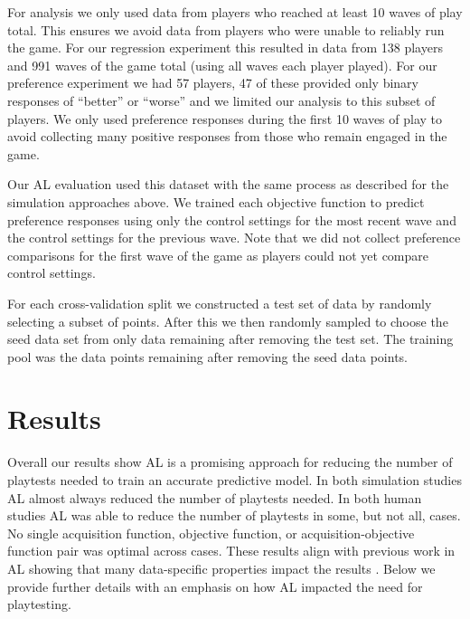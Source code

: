 \documentclass{sig-alternate}
\begin{document}
For analysis we only used data from players who reached at least 10 waves of play total.
This ensures we avoid data from players who were unable to reliably run the game.
For our regression experiment this resulted in data from 138 players and 991 waves of the game total (using all waves each player played).
For our preference experiment we had 57 players, 47 of these provided only binary responses of ``better'' or ``worse'' and we limited our analysis to this subset of players.
We only used preference responses during the first 10 waves of play to avoid collecting many positive responses from those who remain engaged in the game.



Our AL evaluation used this dataset with the same process as described for the simulation approaches above.
We trained each objective function to predict preference responses using only the control settings for the most recent wave and the control settings for the previous wave.
Note that we did not collect preference comparisons for the first wave of the game as players could not yet compare control settings.

For each cross-validation split we constructed a test set of data by randomly selecting a subset of points.
After this we then randomly sampled to choose the seed data set from only data remaining after removing the test set.
The training pool was the data points remaining after removing the seed data points.



\section{Results}

Overall our results show AL is a promising approach for reducing the number of playtests needed to train an accurate predictive model.
In both simulation studies AL almost always reduced the number of playtests needed.
In both human studies AL was able to reduce the number of playtests in some, but not all, cases.
No single acquisition function, objective function, or acquisition-objective function pair was optimal across cases.
These results align with previous work in AL showing that many data-specific properties impact the results \cite{schein2007:al-logreg-eval}.
Below we provide further details with an emphasis on how AL impacted the need for playtesting.
\end{document}
